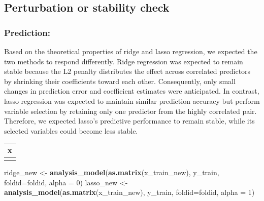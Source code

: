 \documentclass[
  11pt,
]{article}
\newenvironment{Shaded}{\begin{snugshade}}{\end{snugshade}}
\newcommand{\AttributeTok}[1]{\textcolor[rgb]{0.13,0.29,0.53}{#1}}
\newcommand{\DecValTok}[1]{\textcolor[rgb]{0.00,0.00,0.81}{#1}}
\newcommand{\FloatTok}[1]{\textcolor[rgb]{0.00,0.00,0.81}{#1}}
\newcommand{\FunctionTok}[1]{\textcolor[rgb]{0.13,0.29,0.53}{\textbf{#1}}}
\newcommand{\NormalTok}[1]{#1}
\newcommand{\OtherTok}[1]{\textcolor[rgb]{0.56,0.35,0.01}{#1}}
\newcommand{\SpecialCharTok}[1]{\textcolor[rgb]{0.81,0.36,0.00}{\textbf{#1}}}
\newcounter{none} %
\begin{document}
\subsection{Perturbation or stability
check}\label{perturbation-or-stability-check}

\subsubsection{Prediction:}\label{prediction}

Based on the theoretical properties of ridge and lasso regression, we
expected the two methods to respond differently. Ridge regression was
expected to remain stable because the L2 penalty distributes the effect
across correlated predictors by shrinking their coefficients toward each
other. Consequently, only small changes in prediction error and
coefficient estimates were anticipated. In contrast, lasso regression
was expected to maintain similar prediction accuracy but perform
variable selection by retaining only one predictor from the highly
correlated pair. Therefore, we expected lasso's predictive performance
to remain stable, while its selected variables could become less stable.

\begin{Shaded}
\end{Shaded}

{\def\LTcaptype{none} %
\begin{longtable}[]{@{}r@{}}
\toprule\noalign{}
x \\
\midrule\noalign{}
\endhead
\bottomrule\noalign{}
\endlastfoot
0.994593 \\
\end{longtable}
}

\begin{Shaded}
\begin{Highlighting}[]
\NormalTok{ridge\_new }\OtherTok{\textless{}{-}} \FunctionTok{analysis\_model}\NormalTok{(}\FunctionTok{as.matrix}\NormalTok{(x\_train\_new), y\_train, }\AttributeTok{foldid=}\NormalTok{foldid, }\AttributeTok{alpha =} \DecValTok{0}\NormalTok{)}
\NormalTok{lasso\_new }\OtherTok{\textless{}{-}} \FunctionTok{analysis\_model}\NormalTok{(}\FunctionTok{as.matrix}\NormalTok{(x\_train\_new), y\_train, }\AttributeTok{foldid=}\NormalTok{foldid, }\AttributeTok{alpha =} \DecValTok{1}\NormalTok{)}
\end{Highlighting}
\end{Shaded}
\end{document}
